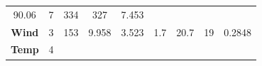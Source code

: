\documentclass[]{article}
\theoremstyle{definition}
\theoremstyle{definition}
\theoremstyle{definition}
\theoremstyle{remark}
\begin{document}
\begin{longtable}[]{@{}ccccccccc@{}}
\begin{minipage}[t]{0.08\columnwidth}
90.06\strut
\end{minipage} & \begin{minipage}[t]{0.06\columnwidth}\centering\strut
7\strut
\end{minipage} & \begin{minipage}[t]{0.07\columnwidth}\centering\strut
334\strut
\end{minipage} & \begin{minipage}[t]{0.08\columnwidth}\centering\strut
327\strut
\end{minipage} & \begin{minipage}[t]{0.08\columnwidth}\centering\strut
7.453\strut
\end{minipage}\tabularnewline
\begin{minipage}[t]{0.15\columnwidth}\centering\strut
\textbf{Wind}\strut
\end{minipage} & \begin{minipage}[t]{0.07\columnwidth}\centering\strut
3\strut
\end{minipage} & \begin{minipage}[t]{0.06\columnwidth}\centering\strut
153\strut
\end{minipage} & \begin{minipage}[t]{0.08\columnwidth}\centering\strut
9.958\strut
\end{minipage} & \begin{minipage}[t]{0.08\columnwidth}\centering\strut
3.523\strut
\end{minipage} & \begin{minipage}[t]{0.06\columnwidth}\centering\strut
1.7\strut
\end{minipage} & \begin{minipage}[t]{0.07\columnwidth}\centering\strut
20.7\strut
\end{minipage} & \begin{minipage}[t]{0.08\columnwidth}\centering\strut
19\strut
\end{minipage} & \begin{minipage}[t]{0.08\columnwidth}\centering\strut
0.2848\strut
\end{minipage}\tabularnewline
\begin{minipage}[t]{0.15\columnwidth}\centering\strut
\textbf{Temp}\strut
\end{minipage} & \begin{minipage}[t]{0.07\columnwidth}\centering\strut
4\strut
\end{minipage} & \begin{minipage}[t]{0.06\columnwidth}\centering\strut

\end{minipage}
\end{longtable}
\end{document}
